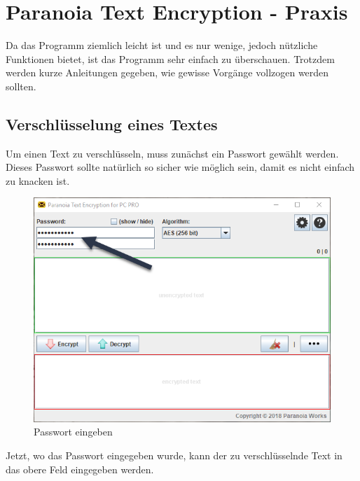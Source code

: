 \documentclass[12pt,a4paper]{scrreprt}
\begin{document}
\chapter{Paranoia Text Encryption - Praxis}
Da das Programm ziemlich leicht ist und es nur wenige, jedoch nützliche Funktionen bietet, ist das Programm sehr einfach zu überschauen. Trotzdem werden kurze Anleitungen gegeben, wie gewisse Vorgänge vollzogen werden sollten.

\section{Verschlüsselung eines Textes}
Um einen Text zu verschlüsseln, muss zunächst ein Passwort gewählt werden. Dieses Passwort sollte natürlich so sicher wie möglich sein, damit es nicht einfach zu knacken ist.

\begin{figure}[h]
\begin{center}
\includegraphics[width=350pt]{media/pte1.png}
\caption{Passwort eingeben}
\label{pte1}
\end{center}
\end{figure}

\newpage

\noindent Jetzt, wo das Passwort eingegeben wurde, kann der zu verschlüsselnde Text in das obere Feld eingegeben werden.
\end{document}
